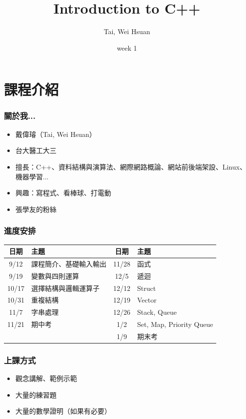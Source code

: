\documentclass[xcolor=dvipsnames]{beamer}
\title{Introduction to C++}
\author{Tai, Wei Hsuan}
\date{week 1}
\begin{document}
	\begin{frame}
		\titlepage
	\end{frame}

    \section{課程介紹}
    \begin{frame}
        \frametitle{關於我...}
        \begin{itemize}
            \item 戴偉璿（Tai, Wei Hsuan）
            \item 台大醫工大三
            \item 擅長：C++、資料結構與演算法、網際網路概論、網站前後端架設、Linux、機器學習...
            \item 興趣：寫程式、看棒球、打電動
            \item 張學友的粉絲
        \end{itemize}
    \end{frame}

    \begin{frame}
        \frametitle{進度安排}
        \begin{table}[h]
        \begin{tabular}{cl  cl}
        \toprule
        日期 & 主題 & 日期 & 主題 \\
        \midrule
        9/12  & 課程簡介、基礎輸入輸出   & 11/28 & 函式 \\
        9/19  & 變數與四則運算           & 12/5  & 遞迴 \\
        10/17 & 選擇結構與邏輯運算子     & 12/12 & Struct \\
        10/31 & 重複結構                 & 12/19 & Vector \\
        11/7  & 字串處理                 & 12/26 & Stack, Queue \\
        11/21 & 期中考                   & 1/2   & Set, Map, Priority Queue \\
            &                          & 1/9   & 期末考 \\
        \bottomrule
        \end{tabular}
        \end{table}
    \end{frame}

    \begin{frame}
        \frametitle{上課方式}
        \begin{itemize}
            \item 觀念講解、範例示範
            \item 大量的練習題
            \item 大量的數學證明（如果有必要）
        \end{itemize}
    \end{frame}
\end{document}
